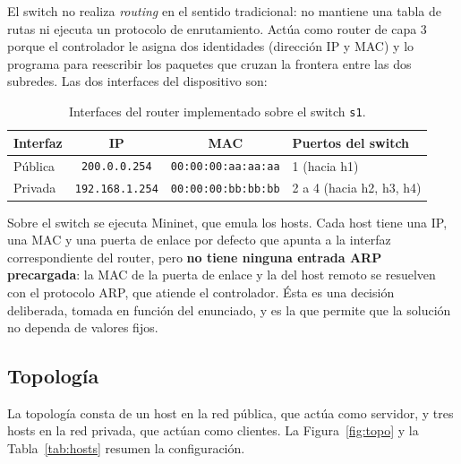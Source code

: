 ﻿\documentclass[10pt,a4paper]{article}
\begin{document}
El switch no realiza \emph{routing} en el sentido tradicional: no mantiene una tabla
de rutas ni ejecuta un protocolo de enrutamiento. Actúa como router de capa 3 porque
el controlador le asigna dos identidades (dirección IP y MAC) y lo programa para
reescribir los paquetes que cruzan la frontera entre las dos subredes. Las dos
interfaces del dispositivo son:

\begin{table}[H]
\centering
\begin{tabular}{lccl}
\toprule
\textbf{Interfaz} & \textbf{IP} & \textbf{MAC} & \textbf{Puertos del switch} \\
\midrule
Pública & \texttt{200.0.0.254}   & \texttt{00:00:00:aa:aa:aa} & 1 (hacia h1) \\
Privada & \texttt{192.168.1.254} & \texttt{00:00:00:bb:bb:bb} & 2 a 4 (hacia h2, h3, h4) \\
\bottomrule
\end{tabular}
\caption{Interfaces del router implementado sobre el switch \texttt{s1}.}
\end{table}

Sobre el switch se ejecuta Mininet, que emula los hosts. Cada host tiene una IP, una
MAC y una puerta de enlace por defecto que apunta a la interfaz correspondiente del
router, pero \textbf{no tiene ninguna entrada ARP precargada}: la MAC de la puerta
de enlace y la del host remoto se resuelven con el protocolo ARP, que atiende el
controlador. Ésta es una decisión deliberada, tomada en función del enunciado, y es
la que permite que la solución no dependa de valores fijos.

\subsection{Topología}

La topología consta de un host en la red pública, que actúa como servidor, y tres
hosts en la red privada, que actúan como clientes. La Figura~\ref{fig:topo} y la
Tabla~\ref{tab:hosts} resumen la configuración.
\end{document}
